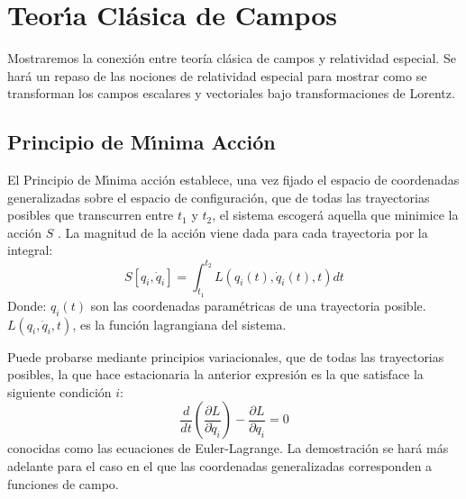 \chapter{Teor\'\i a Cl\'asica de Campos}
\label{chap:tcc} %
Mostraremos la conexión entre teoría clásica de campos y relatividad especial.
Se hará un repaso de las nociones de relatividad especial para mostrar como se transforman los campos escalares y vectoriales bajo transformaciones de Lorentz.
\section{Principio de M\'\i nima Acci\'on}
\label{sec:la}

El Principio de M\'\i nima acci\'on establece, una vez fijado el espacio de
coordenadas generalizadas sobre el espacio de configuraci\'on, que de
todas las trayectorias posibles que transcurren entre $t_1$ y $t_2$,
el sistema escoger\'a aquella que minimice la acci\'on $S$
\cite{ActionPhysics}.  La magnitud de la acci\'on viene dada para cada
trayectoria por la integral:
\begin{equation}
  \label{eq:la}
   S\left[q_i,\dot{q}_i\right] = \int_{t_{1}}^{t_{2}} L(q_i(t), \dot{q}_i(t),t) dt
\end{equation}
Donde:
$q_i(t)$ son las coordenadas param\'etricas de una trayectoria posible.
$L(q_i,\dot{q}_i,t)$, es la funci\'on lagrangiana del sistema.


Puede probarse mediante principios variacionales, que de todas las trayectorias posibles, la que hace  estacionaria la anterior expresi\'on es la que satisface la siguiente condici\'on $i$:
\begin{equation}
  \label{eq:eel}
 \frac{d}{dt} \left ( \frac{\partial L}{\partial\dot{q}_i} \right ) - \frac{\partial L}{\partial q_i} = 0
\end{equation}
conocidas como las ecuaciones de Euler-Lagrange. La demostraci\'on se
har\'a m\'as adelante para el caso en el que las coordenadas generalizadas
corresponden a funciones de campo. 

